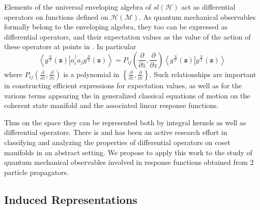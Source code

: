 \documentclass[aps,preprint]{revtex4}%
\begin{document}
Elements of the universal enveloping algebra of $sl\left(  \mathcal{H}\right)
$ act as differential operators on functions defined on $\mathcal{H}\left(
\mathcal{M}\right)  $. As quantum mechanical observables formally belong to
the enveloping algebra, they too can be expressed as differential operators,
and their expectation values as the value of the action of these operators at
points in . In particular
\begin{equation}
\left\langle \left.  g^{\frac{N}{2}}\left(  \mathbf{z}\right)  \right\vert
a_{i}^{\dagger}a_{j}g^{\frac{N}{2}}\left(  \mathbf{z}\right)  \right\rangle
=P_{ij}\left(  \frac{\partial}{\partial\bar{z}},\frac{\partial}{\partial
z}\right)  \left\langle \left.  g^{\frac{N}{2}}\left(  \mathbf{z}\right)
\right\vert g^{\frac{N}{2}}\left(  \mathbf{z}\right)  \right\rangle
\end{equation}
where $P_{ij}\left(  \frac{\partial}{\partial\bar{z}},\frac{\partial}{\partial
z}\right)  $ is a polynomial in $\left\{  \frac{\partial}{\partial\bar{z}%
},\frac{\partial}{\partial z}\right\}  .$ Such relationships are important in
constructing efficient expressions for expectation values, as well as for the
various terms appearing the in generalized classical equations of motion on
the coherent state manifold and the associated linear response functions.

Thus on the space they can be represented both by integral kernels as well as
differential operators. There is and has been an active research effort in
classifying and analyzing the properties of differential operators on coset
manifolds in an abstract setting. We propose to apply this work to the study
of quantum mechanical observables involved in response functions obtained from
2 particle propagators.

\subsection{Induced Representations}
\end{document}
